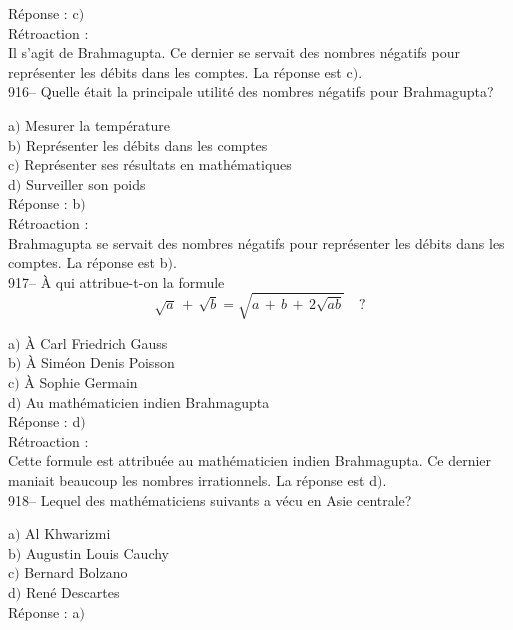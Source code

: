 ﻿\documentclass[letterpaper, 12pt]{article}
\begin{document}
R\'eponse : c$)$\\

R\'etroaction : \\
Il s'agit de Brahmagupta. Ce dernier se servait des nombres n\'egatifs pour
repr\'esenter les d\'ebits dans les comptes. La r\'eponse est c$)$.\\

916-- Quelle \'etait la principale utilit\'e des nombres n\'egatifs
pour Brahmagupta?

a$)$ Mesurer la temp\'erature \\
b$)$ Repr\'esenter les d\'ebits dans les comptes \\
c$)$ Repr\'esenter ses r\'esultats en math\'ematiques \\
d$)$ Surveiller son poids  \\

R\'eponse : b$)$\\

R\'etroaction : \\
Brahmagupta se servait des nombres n\'egatifs pour repr\'esenter les
d\'ebits dans les comptes. La r\'eponse est b$)$.\\

917-- \`A qui attribue-t-on la formule
$$\sqrt a\,+\,\sqrt b=\sqrt{a\,+\,b\,+\,2\sqrt{ab}}\quad?$$

a$)$ \`A Carl Friedrich Gauss \\
b$)$ \`A Sim\'eon Denis Poisson \\
c$)$ \`A Sophie Germain \\
d$)$ Au math\'ematicien indien Brahmagupta  \\

R\'eponse : d$)$\\

R\'etroaction : \\
Cette formule est attribu\'ee au math\'ematicien indien Brahmagupta.
Ce dernier maniait
beaucoup les nombres irrationnels. La r\'eponse est d$)$.\\

918-- Lequel des math\'ematiciens suivants a v\'ecu en Asie
centrale?

a$)$ Al Khwarizmi \\
b$)$ Augustin Louis Cauchy \\
c$)$ Bernard Bolzano \\
d$)$ Ren\'e Descartes  \\

R\'eponse : a$)$\\
\end{document}
